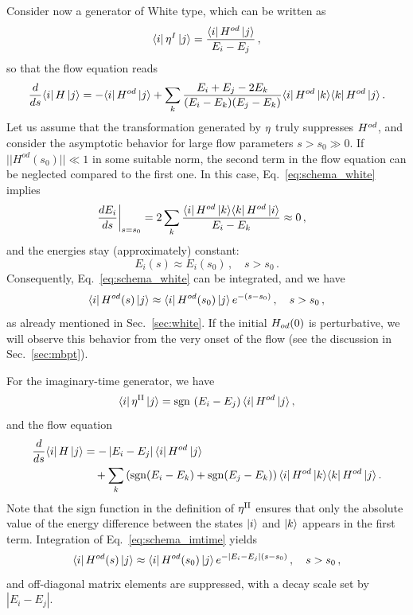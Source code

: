 Consider now a generator of White type, which can be written as
\begin{equation}
  \langle{i}|\,{\eta^I}\,|{j}\rangle=\frac{\langle{i}|\,{H^{od}}\,|{j}\rangle}{E_i-E_j}\,,
\end{equation}
so that the flow equation reads
\begin{align}
  \totd{}{s}\matrixe{i}{\HO}{j}
  =-\matrixe{i}{\HO^{od}}{j}
  +\sum_k\frac{E_i+E_j-2E_k}{(E_i-E_k)(E_j-E_k)}\matrixe{i}{\HO^{od}}{k}\matrixe{k}{\HO^{od}}{j}\,.\label{eq:schema_white}
\end{align}
Let us assume that the transformation generated by $\eta$ truly suppresses $H^{od}$, and consider the asymptotic behavior for large flow parameters $s>s_0\gg0$. If $||H^{od}(s_0)||\ll 1$ in some suitable norm, the second term in the flow equation can be neglected compared to the first one. In this case, Eq.~\eqref{eq:schema_white} implies
\begin{align}
  \left. \frac{d {E_i}} {d {s}} \right|_{s=s_0}&=2\sum_k\frac{\langle{i}|\,{H^{od}}\,|{k}\rangle\langle{k}|\,{H^{od}}\,|{i}\rangle}{E_i-E_k}
  \approx0\,,
\end{align}
and the energies stay (approximately) constant:
\begin{equation}
  E_i(s) \approx E_i(s_0)\,,\quad s>s_0\,.
\end{equation}
Consequently, Eq.~\eqref{eq:schema_white} can be integrated, and we have
\begin{equation}
  \langle{i}|\,{H^{od}(s)}\,|{j}\rangle \approx \langle{i}|\,{H^{od}(s_0)}\,|{j}\rangle\,e^{-(s-s_0)}\,,\quad s>s_0\,,
\end{equation}
as already mentioned in Sec.~\ref{sec:white}. If the initial $H_{od}(0)$ is perturbative, we will observe this behavior from the very onset of the flow (see the discussion in Sec.~\ref{sec:mbpt}).

For the imaginary-time generator, we have
\begin{equation}
  \langle{i}|\,{\eta^\text{II}}\,|{j}\rangle=\mathrm{sgn}\,\left(E_i-E_j\right)\langle{i}|\,{H^{od}}\,|{j}\rangle\,,
\end{equation}
and the flow equation
\begin{align}
  \totd{}{s}\matrixe{i}{\HO}{j}
  &=-\left|E_i-E_j\right|\matrixe{i}{\HO^{od}}{j}\notag\\
  &\quad
    +\sum_k\left(\sgn\!\!\left(E_i-E_k\right)+\sgn\!\!\left(E_j-E_k\right)\right)\matrixe{i}{\HO^{od}}{k}\matrixe{k}{\HO^{od}}{j}\,.
    \label{eq:schema_imtime}
\end{align}
Note that the sign function in the definition of $\eta^\text{II}$ ensures that only the absolute value of the energy difference between the states $\ket{i}$ and $\ket{k}$ appears in the first term. Integration of Eq.~\eqref{eq:schema_imtime} yields
\begin{equation}
  \langle{i}|\,{H^{od}(s)}\,|{j}\rangle \approx \langle{i}|\,{H^{od}(s_0)}\,|{j}\rangle\,e^{-|E_i-E_j|(s-s_0)}\,, \quad s>s_0\,,
\end{equation}
and off-diagonal matrix elements are suppressed, with a decay scale set by $|E_i-E_j|$.

